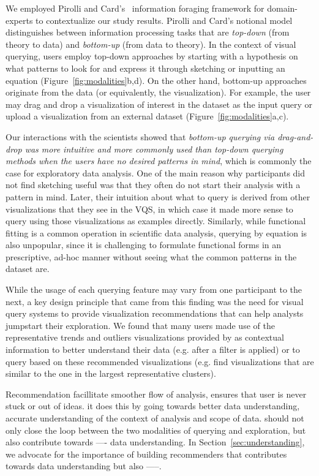 \par We employed Pirolli and Card's~\cite{Pirolli} information foraging framework for domain-experts to contextualize our study results. Pirolli and Card's notional model distinguishes between information processing tasks that are \textit{top-down} (from theory to data) and \textit{bottom-up} (from data to theory). In the context of visual querying, users employ top-down approaches by starting with a hypothesis on what patterns to look for and express it through sketching or inputting an equation (Figure~\ref{fig:modalities}b,d). On the other hand, bottom-up approaches originate from the data (or equivalently, the visualization). For example, the user may drag and drop a visualization of interest in the dataset as the input query or upload a visualization from an external dataset (Figure~\ref{fig:modalities}a,c). 
\par Our interactions with the scientists showed that \emph{bottom-up querying via drag-and-drop was more intuitive and more commonly used than top-down querying methods when the users have no desired patterns in mind}, which is commonly the case for exploratory data analysis. One of the main reason why participants did not find sketching useful was that they often do not start their analysis with a pattern in mind. Later, their intuition about what to query is derived from other visualizations that they see in the VQS, in which case it made more sense to query using those visualizations as examples directly. Similarly, while functional fitting is a common operation in scientific data analysis, querying by equation is also unpopular, since it is challenging to formulate functional forms in an prescriptive, ad-hoc manner without seeing what the common patterns in the dataset are. 
\par While the usage of each querying feature may vary from one participant to the next, a key design principle that came from this finding was the need for visual query systems to provide visualization recommendations that can help analysts jumpstart their exploration. We found that many users made use of the representative trends and outliers visualizations provided by \zv as contextual information to better understand their data (e.g. after a filter is applied) or to query based on these recommended visualizations (e.g. find visualizations that are similar to the one in the largest representative clusters). 
\par Recommendation facillitate smoother flow of analysis, ensures that user is never stuck or out of ideas. it does this by going towards better data understanding, accurate understanding of the context of analysis and scope of data. should not only close the loop between the two modalities of querying and exploration, but also contribute towards ---- data understanding. In Section~\ref{sec:understanding}, we advocate for the importance of building recommenders that contributes towards data understanding but also -----. 


